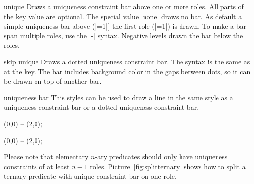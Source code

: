\documentclass[a4paper,10pt]{article}
\begin{document}

\begin{stylekey}{unique}
Draws a uniqueness constraint bar above one or more roles. All parts of the key value are optional. The special value |none| draws no bar. As default a simple uniqueness bar above (|=1|) the first role (|=1|) is drawn. To make a bar span multiple roles, use the |-| syntax. Negative levels drawn the bar below the roles.
\begin{codeexample}[]
\end{codeexample}
\end{stylekey}

\begin{stylekey}{skip unique}
Draws a dotted uniqueness constraint bar. The syntax is the same as at the  key.
The bar includes background color in the gaps between dots, so it can be drawn on top of 
another bar.
\begin{codeexample}[]
\begin{tikzpicture}[orm]
\ternary[unique=1-3,skip unique=2] {};
\end{tikzpicture}
\end{codeexample}
\end{stylekey}

\begin{stylekey}{uniqueness bar}
This styles can be used to draw a line in the same style as a uniqueness constraint bar or a dotted uniqueness constraint bar.
\begin{codeexample}[width=3cm]
\tikz{} (0,0) -- (2,0);
\end{codeexample}
\begin{codeexample}[width=3cm]
\tikz{} (0,0) -- (2,0);
\end{codeexample}
\end{stylekey}

\noindent
Please note that elementary $n$-ary predicates should only have uniqueness constraints of at least $n-1$ roles. Picture~\ref{fig:splitternary} shows how to split a ternary predicate with unique constraint bar on one role.
\end{document}
